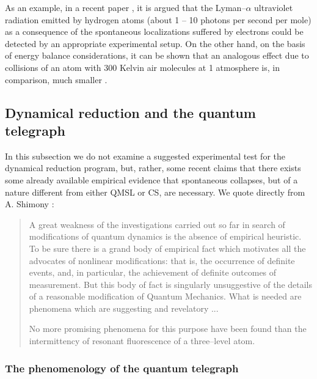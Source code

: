 \documentclass[12pt]{article}
\begin{document}
As an example, in a recent paper \cite{prc}, it is argued that the
Lyman--$\alpha$ ultraviolet radiation emitted by hydrogen atoms
(about 1 -- 10 photons per second per mole) as a consequence of
the spontaneous localizations suffered by electrons could be
detected by an appropriate experimental setup. On the other hand,
on the basis of energy balance considerations, it can be shown
that an analogous effect due to collisions of an atom with 300
Kelvin air molecules at 1 atmosphere is, in
comparison, much smaller .


\subsection{Dynamical reduction and the quantum telegraph}
\label{sec152}

In this subsection we do not examine a suggested experimental test
for the dynamical reduction program, but, rather, some recent
claims that there exists some already available empirical evidence
that spontaneous collapses, but of a nature
different from either QMSL or CS, are necessary. We quote directly from
A. Shimony \cite{shi90}:
\begin{quotation}
A great weakness of the investigations carried out so far in
search of modifications of quantum dynamics is the absence of
empirical heuristic. To be sure there is a grand body of empirical
fact which motivates all the advocates of nonlinear modifications:
that is, the occurrence of definite events, and, in particular,
the achievement of definite outcomes of measurement. But this body
of fact is singularly unsuggestive of the details of a reasonable
modification of Quantum Mechanics. What is needed are phenomena
which are suggesting and revelatory ...

No more promising phenomena for this purpose have been found than
the intermittency of resonant fluorescence of a three--level atom.
\end{quotation}

\subsubsection{The phenomenology of the quantum telegraph}
\label{sec1521}
\end{document}

